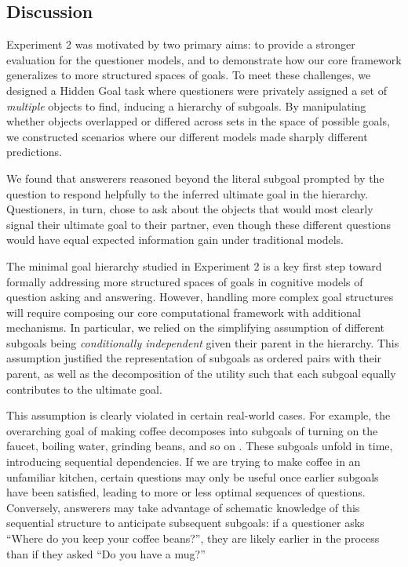 \documentclass[11pt, floatsintext]{apa6}
\begin{document}
\subsection{Discussion}

Experiment 2 was motivated by two primary aims: to provide a stronger evaluation for the questioner models, and to demonstrate how our core framework generalizes to more structured spaces of goals.
To meet these challenges, we designed a Hidden Goal task where questioners were privately assigned a set of \emph{multiple} objects to find, inducing a hierarchy of subgoals.
By manipulating whether objects overlapped or differed across sets in the space of possible goals, we constructed scenarios where our different models made sharply different predictions. 

We found that answerers reasoned beyond the literal subgoal prompted by the question to respond helpfully to the inferred ultimate goal in the hierarchy.
Questioners, in turn, chose to ask about the objects that would most clearly signal their ultimate goal to their partner, even though these different questions would have equal expected information gain under traditional models. 

The minimal goal hierarchy studied in Experiment 2 is a key first step toward formally addressing more structured spaces of goals in cognitive models of question asking and answering. 
However, handling more complex goal structures will require composing our core computational framework with additional mechanisms.
In particular, we relied on the simplifying assumption of different subgoals being \emph{conditionally independent} given their parent in the hierarchy. 
This assumption justified the representation of subgoals as ordered pairs with their parent, as well as the decomposition of the utility such that each subgoal equally contributes to the ultimate goal. 

This assumption is clearly violated in certain real-world cases.
For example, the overarching goal of making coffee decomposes into subgoals of turning on the faucet, boiling water, grinding beans, and so on \cite{jackendoff2007language}. 
These subgoals unfold in time, introducing sequential dependencies.
If we are trying to make coffee in an unfamiliar kitchen, certain questions may only be useful once earlier subgoals have been satisfied, leading to more or less optimal sequences of questions.
Conversely, answerers may take advantage of schematic knowledge of this sequential structure to anticipate subsequent subgoals: if a questioner asks ``Where do you keep your coffee beans?'', they are likely earlier in the process than if they asked ``Do you have a mug?'' 
\end{document}
